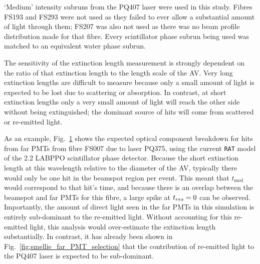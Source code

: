 `Medium' intensity subruns from the PQ407 laser were used in this study. %
Fibres FS193 and FS293 were not used as they failed to ever allow a substantial amount of light through them; FS207 was also not used as there was no beam profile distribution made for that fibre. Every scintillator phase subrun being used was matched to an equivalent water phase subrun.

The sensitivity of the extinction length measurement is strongly dependent on the ratio of that extinction length to the length scale of the AV. Very long extinction lengths are difficult to measure because only a small amount of light is expected to be lost due to scattering or absorption. In contrast, at short extinction lengths only a very small amount of light will reach the other side without being extinguished; the dominant source of hits will come from scattered or re-emitted light.

As an example, Fig.~\ref{fig:smellie_PQ375_far_pmts_components} shows the expected optical component breakdown for hits from far PMTs from fibre FS007 due to laser PQ375, using the current \texttt{RAT} model of the \SI{2.2}{\gpl} LABPPO scintillator phase detector. Because the short extinction length at this wavelength relative to the diameter of the AV, typically there would only be one hit in the beamspot region per event. This meant that $t_{\mathrm{med}}$ would correspond to that hit's time, and because there is an overlap between the beamspot and far PMTs for this fibre, a large spike at $t_{res}{} = 0$ can be observed. Importantly, the amount of direct light seen in the far PMTs in this simulation is entirely sub-dominant to the re-emitted light. Without accounting for this re-emitted light, this analysis would over-estimate the extinction length substantially. In contrast, it has already been shown in Fig.~\ref{fig:smellie_far_PMT_selection} that the contribution of re-emitted light to the PQ407 laser is expected to be sub-dominant.

\begin{figure}
    \centering
    \caption[]{}
    \label{fig:smellie_PQ375_far_pmts_components}
\end{figure}

